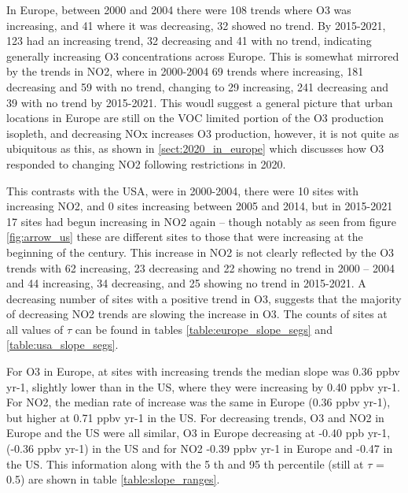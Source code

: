 \documentclass[journal abbreviation, manuscript]{copernicus}
\begin{document}
In Europe, between 2000 and 2004 there were 108 trends where O3 was increasing, and 41 where it was decreasing, 32 showed no trend. By 2015-2021, 123 had an increasing trend, 32 decreasing and 41 with no trend, indicating generally increasing O3 concentrations across Europe. This is somewhat mirrored by the trends in NO2, where in 2000-2004 69 trends where increasing, 181 decreasing and 59 with no trend, changing to 29 increasing, 241 decreasing and 39 with no trend by 2015-2021. This woudl suggest a general picture that urban locations in Europe are still on the VOC limited portion of the O3 production isopleth, and decreasing NOx increases O3 production, however, it is not quite as ubiquitous as this, as shown in \ref{sect:2020_in_europe} which discusses how O3 responded to changing NO2 following restrictions in 2020. 

This contrasts with the USA, were in 2000-2004, there were 10 sites with increasing NO2, and 0 sites increasing between 2005 and 2014, but in 2015-2021 17 sites had begun increasing in NO2 again – though notably as seen from figure \ref{fig:arrow_us} these are different sites to those that were increasing at the beginning of the century. This increase in NO2 is not clearly reflected by the O3 trends with 62 increasing, 23 decreasing and 22 showing no trend in 2000 – 2004 and 44 increasing, 34 decreasing, and 25 showing no trend in 2015-2021. A decreasing number of sites  with a positive trend in O3, suggests that the majority of decreasing NO2 trends are slowing the increase in O3. The counts of sites at all values of $\tau$ can be found in tables \ref{table:europe_slope_segs} and \ref{table:usa_slope_segs}. 

For O3 in Europe, at sites with increasing trends the median slope was 0.36 ppbv yr-1, slightly lower than in the US, where they were increasing by 0.40 ppbv yr-1. For NO2, the median rate of increase was the same in Europe (0.36 ppbv yr-1), but higher at 0.71 ppbv yr-1 in the US. For decreasing trends, O3 and NO2 in Europe and the US were all similar, O3 in Europe decreasing at -0.40 ppb yr-1, (-0.36 ppbv yr-1) in the US and for NO2 -0.39 ppbv yr-1 in Europe and -0.47 in the US. This information along with the 5 th and 95 th percentile (still at $\tau$ = 0.5) are shown in table \ref{table:slope_ranges}. 









\end{document}
